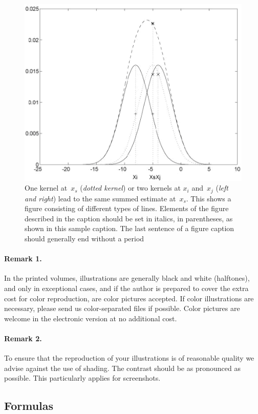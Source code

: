 \documentclass[runningheads]{AIIT}
\begin{document}
\begin{figure}
\centering
\includegraphics[width=.7\textwidth]{figure}
\caption{One kernel at~$x_s$ (\emph{dotted kernel}) or two kernels at $x_i$ and~$x_j$
(\emph{left and right}) lead to the same summed estimate at~$x_s$. This shows
a figure consisting of different types of lines. Elements of the figure described
in the caption should be set in italics, in parentheses, as shown in this sample
caption. The last sentence of a figure caption should generally end without a period}\label{fig:afigure}
\end{figure}

\paragraph{Remark 1.} In the printed volumes, illustrations are generally black and
white (halftones), and only in exceptional cases, and if the author is
prepared to cover the extra cost for color reproduction, are color pictures
accepted. If color illustrations are necessary, please send us color-separated
files if possible. Color pictures are welcome in the electronic version at no
additional cost.

\paragraph{Remark 2.} To ensure that the reproduction of your illustrations is of
reasonable quality we advise against the use of shading. The contrast should
be as pronounced as possible. This particularly applies for screenshots.

\subsection{Formulas}
\end{document}
